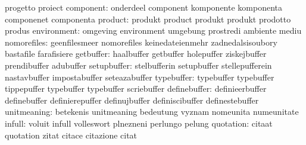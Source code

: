                                  progetto                         proiect
                       component: onderdeel                        component
                                  komponente                       komponenta
                                  componenet                       componenta
                         product: produkt                          product
                                  produkt                          produkt
                                  prodotto                         produs
                     environment: omgeving                         environment
                                  umgebung                         prostredi
                                  ambiente                         mediu
                     nomorefiles: geenfilesmeer                    nomorefiles
                                  keinedateienmehr                 zadnedalsisoubory
                                  bastafile                        farafisiere
                       getbuffer: haalbuffer                       getbuffer
                                  holepuffer                       ziskejbuffer
                                  prendibuffer                     adubuffer
                     setupbuffer: stelbufferin                     setupbuffer
                                  stellepufferein                  nastavbuffer
                                  impostabuffer                    seteazabuffer
                      typebuffer: typebuffer                       typebuffer
                                  tippepuffer                      typebuffer
                                  typebuffer                       scriebuffer %
                    definebuffer: definieerbuffer                  definebuffer
                                  definierepuffer                  definujbuffer
                                  definiscibuffer                  definestebuffer
                     unitmeaning: betekenis                        unitmeaning
                                  bedeutung                        vyznam
                                  nomeunita                        numeunitate %
                          infull: voluit                           infull
                                  volleswort                       plnezneni
                                  perlungo                         pelung
                       quotation: citaat                           quotation
                                  zitat                            citace
                                  citazione                        citat
